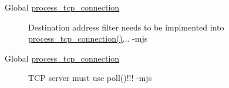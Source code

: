 \label{todo__todo000017}
\hypertarget{todo__todo000017}{}
 \begin{description}
\item[Global \hyperlink{tcpserver_8c_0eb8fdec50bfdfa77f5dca2e40ba7f99}{process\_\-tcp\_\-connection} ]Destination address filter needs to be implmented into \hyperlink{tcpserver_8c_0eb8fdec50bfdfa77f5dca2e40ba7f99}{process\_\-tcp\_\-connection()}... -mjs \end{description}


\label{todo__todo000017}
\hypertarget{todo__todo000017}{}
 \begin{description}
\item[Global \hyperlink{tcpserver_8c_0eb8fdec50bfdfa77f5dca2e40ba7f99}{process\_\-tcp\_\-connection} ]TCP server must use poll()!!! -mjs \end{description}
